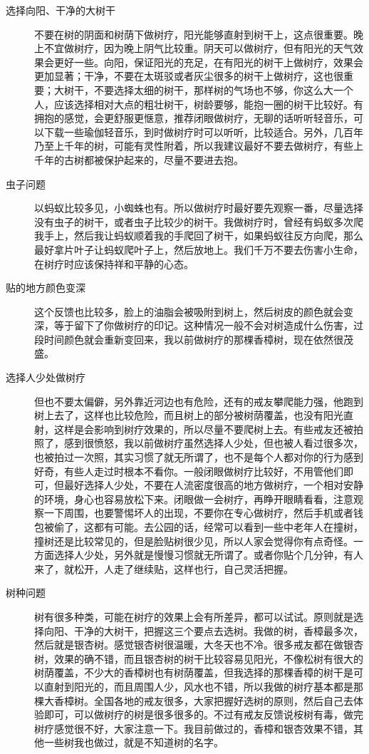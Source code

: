 \documentclass{ctexart}
\begin{document}
\begin{description}
    \item[选择向阳、干净的大树干] 不要在树的阴面和树荫下做树疗，阳光能够直射到树干上，这点很重要。晚上不宜做树疗，因为晚上阴气比较重。阴天可以做树疗，但有阳光的天气效果会更好一些。向阳，保证阳光的充足，在有阳光的树干上做树疗，效果会更加显著；干净，不要在太斑驳或者灰尘很多的树干上做树疗，这也很重要；大树干，不要选择太细的树干，那样树的气场也不够，你这么大一个人，应该选择相对大点的粗壮树干，树龄要够，能抱一圈的树干比较好。有拥抱的感觉，会更舒服更惬意，推荐闭眼做树疗，无聊的话听听轻音乐，可以下载一些瑜伽轻音乐，到时做树疗时可以听听，比较适合。另外，几百年乃至上千年的树，可能有灵性附着，所以我建议最好不要去做树疗，有些上千年的古树都被保护起来的，尽量不要进去抱。
    \item[虫子问题] 以蚂蚁比较多见，小蜘蛛也有。所以做树疗时最好要先观察一番，尽量选择没有虫子的树干，或者虫子比较少的树干。我做树疗时，曾经有蚂蚁多次爬我手上，然后我让蚂蚁顺着我的手爬回了树干，如果蚂蚁往反方向爬，那么最好拿片叶子让蚂蚁爬叶子上，然后放地上。我们千万不要去伤害小生命，在树疗时应该保持祥和平静的心态。
    \item[贴的地方颜色变深] 这个反馈也比较多，脸上的油脂会被吸附到树上，然后树皮的颜色就会变深，等于留下了你做树疗的印记。这种情况一般不会对树造成什么伤害，过段时间颜色就会重新变回来，我以前做树疗的那棵香樟树，现在依然很茂盛。
    \item[选择人少处做树疗] 但也不要太偏僻，另外靠近河边也有危险，还有的戒友攀爬能力强，他跑到树上去了，这样也比较危险，而且树上的部分被树荫覆盖，也没有阳光直射，这样是会影响到树疗效果的，所以尽量不要爬树上去。有些戒友还被拍照了，感到很愤怒，我以前做树疗虽然选择人少处，但也被人看过很多次，也被拍过一次照，其实习惯了就无所谓了，也不是每个人都对你的行为感到好奇，有些人走过时根本不看你。一般闭眼做树疗比较好，不用管他们即可，但最好选择人少处，不要在人流密度很高的地方做树疗，一个相对安静的环境，身心也容易放松下来。闭眼做一会树疗，再睁开眼睛看看，注意观察一下周围，也要警惕坏人的出现，不要你在专心做树疗，然后手机或者钱包被偷了，这都有可能。去公园的话，经常可以看到一些中老年人在撞树，撞树还是比较常见的，但是脸贴树很少见，所以人家会觉得你有点奇怪。一方面选择人少处，另外就是慢慢习惯就无所谓了。或者你贴个几分钟，有人来了，就松开，人走了继续贴，这样也行，自己灵活把握。
    \item[树种问题] 树有很多种类，可能在树疗的效果上会有所差异，都可以试试。原则就是选择向阳、干净的大树干，把握这三个要点去选树。我做的树，香樟最多次，然后就是银杏树。感觉银杏树很温暖，大冬天也不冷。很多戒友都在做银杏树，效果的确不错，而且银杏树的树干比较容易见阳光，不像松树有很大的树荫覆盖，不少大的香樟树也有树荫覆盖，但我选择的那棵香樟的树干是可以直射到阳光的，而且周围人少，风水也不错，所以我做的树疗基本都是那棵大香樟树。全国各地的戒友很多，大家把握好选树的原则，然后自己去体验即可，可以做树疗的树是很多很多的。不过有戒友反馈说桉树有毒，做完树疗感觉很不好，大家注意一下。我目前做过的，香樟和银杏效果不错，其他一些树我也做过，就是不知道树的名字。
\end{description}
\end{document}
